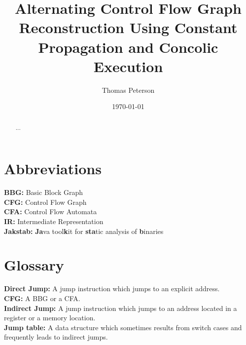 \documentclass{kththesis}
\title{Alternating Control Flow Graph Reconstruction Using Constant Propagation and Concolic Execution}
\author{Thomas Peterson}
\date{\today}
\newcommand{\MONTH}{%
  \ifcase\the\month
  \or January %
  \or February %
  \or March %
  \or April %
  \or May %
  \or June %
  \or July %
  \or August %
  \or September %
  \or October %
  \or November %
  \or December %
  \fi}
\renewcommand{\it}[1]{\textit{#1}}
\begin{document}
\frontmatter

\titlepage

\begin{abstract}
\end{abstract}


\begin{otherlanguage}{swedish}
  \begin{abstract}
    ...
  \end{abstract}
\end{otherlanguage}

\tableofcontents
\thispagestyle{empty}

\clearpage
\thispagestyle{empty}
\section*{Abbreviations}
\textbf{BBG:} Basic Block Graph\\
\textbf{CFG:} Control Flow Graph\\
\textbf{CFA:} Control Flow Automata\\
\textbf{IR:} Intermediate Representation\\
\textbf{Jakstab:} \textbf{Ja}va tool\textbf{k}it for \textbf{sta}tic analysis of \textbf{b}inaries\\

\clearpage
\thispagestyle{empty}
\section*{Glossary}
\textbf{Direct Jump:} A jump instruction which jumps to an explicit address.\\
\textbf{CFG:} A BBG or a CFA.\\
\textbf{Indirect Jump:} A jump instruction which jumps to an address located in a register or a memory location.\\
\textbf{Jump table:} A data structure which sometimes results from switch cases and frequently leads to indirect jumps. \\
\end{document}
